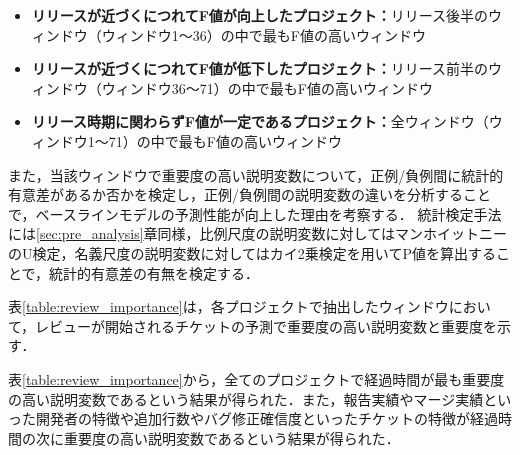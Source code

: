 \documentclass[submit]{ipsj}
\begin{document}
\begin{itemize}
  \item \textbf{リリースが近づくにつれてF値が向上したプロジェクト：}リリース後半のウィンドウ（ウィンドウ1〜36）の中で最もF値の高いウィンドウ
  \item \textbf{リリースが近づくにつれてF値が低下したプロジェクト：}リリース前半のウィンドウ（ウィンドウ36〜71）の中で最もF値の高いウィンドウ
  \item \textbf{リリース時期に関わらずF値が一定であるプロジェクト：}全ウィンドウ（ウィンドウ1〜71）の中で最もF値の高いウィンドウ
\end{itemize}

また，当該ウィンドウで重要度の高い説明変数について，正例/負例間に統計的有意差があるか否かを検定し，正例/負例間の説明変数の違いを分析することで，ベースラインモデルの予測性能が向上した理由を考察する．
統計検定手法には\ref{sec:pre_analysis}章同様，比例尺度の説明変数に対してはマンホイットニーのU検定，名義尺度の説明変数に対してはカイ2乗検定を用いてP値を算出することで，統計的有意差の有無を検定する．


表\ref{table:review_importance}は，各プロジェクトで抽出したウィンドウにおいて，レビューが開始されるチケットの予測で重要度の高い説明変数と重要度を示す．

表\ref{table:review_importance}から，全てのプロジェクトで経過時間が最も重要度の高い説明変数であるという結果が得られた．また，報告実績やマージ実績といった開発者の特徴や追加行数やバグ修正確信度といったチケットの特徴が経過時間の次に重要度の高い説明変数であるという結果が得られた．
\end{document}
